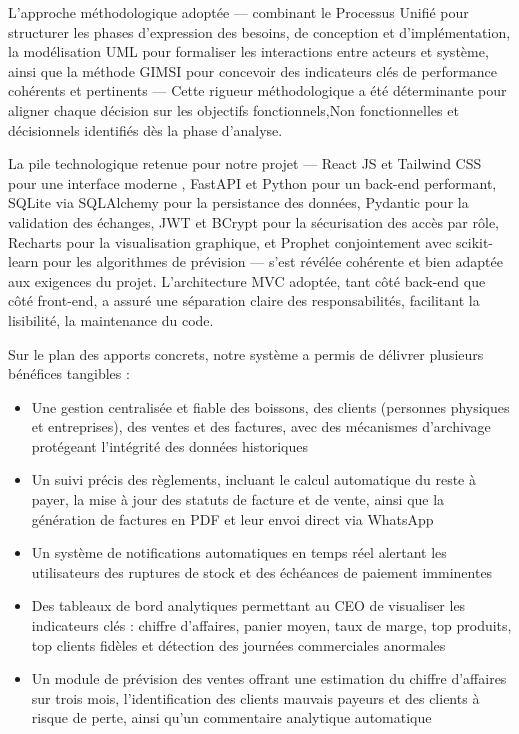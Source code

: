 L'approche méthodologique adoptée --- combinant le Processus Unifié pour structurer
les phases d'expression des besoins, de conception et d'implémentation, la
modélisation UML pour formaliser les interactions entre acteurs et système, ainsi
que la méthode GIMSI pour concevoir des indicateurs clés de performance cohérents
et pertinents ---  Cette rigueur méthodologique a été déterminante pour aligner chaque
décision  sur les objectifs fonctionnels,Non fonctionnelles et décisionnels identifiés dès
la phase d'analyse.

La pile technologique retenue pour notre projet --- React JS et Tailwind CSS pour une
interface moderne , FastAPI et Python pour un back-end performant,
SQLite via SQLAlchemy pour la persistance des données, Pydantic pour la validation
des échanges, JWT et BCrypt pour la sécurisation des accès par rôle, Recharts
pour la visualisation graphique, et Prophet conjointement avec scikit-learn pour
les algorithmes de prévision --- s'est révélée cohérente et bien adaptée aux
exigences du projet. L'architecture MVC adoptée, tant côté back-end que côté
front-end, a assuré une séparation claire des responsabilités, facilitant la
lisibilité, la maintenance  du code.

Sur le plan des apports concrets, notre système a permis de délivrer plusieurs
bénéfices tangibles :

\begin{itemize}[leftmargin=2em, topsep=4pt, itemsep=4pt]
  \item Une gestion centralisée et fiable des boissons, des clients (personnes
  physiques et entreprises), des ventes et des factures, avec des mécanismes
  d'archivage protégeant l'intégrité des données historiques
  \item Un suivi précis des règlements, incluant le calcul automatique du reste
  à payer, la mise à jour des statuts de facture et de vente, ainsi que la
  génération de factures en PDF et leur envoi direct via WhatsApp
  \item Un système de notifications automatiques en temps réel alertant les
  utilisateurs des ruptures de stock et des échéances de paiement imminentes
  \item Des tableaux de bord analytiques permettant au CEO de visualiser les
  indicateurs clés : chiffre d'affaires, panier moyen, taux de marge, top
  produits, top clients fidèles et détection des journées commerciales anormales
  \item Un module de prévision des ventes offrant une estimation du chiffre
  d'affaires sur trois mois, l'identification des clients mauvais payeurs et des
  clients à risque de perte, ainsi qu'un commentaire analytique automatique
\end{itemize}

